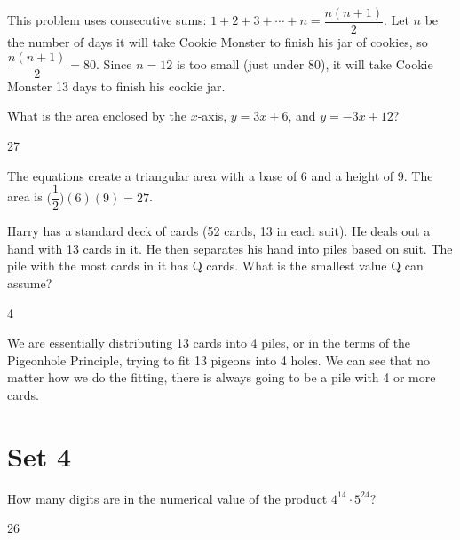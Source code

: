 \documentclass[11pt]{article}
\begin{document}
\begin{solution}
This problem uses consecutive sums: $1+2+3+ \cdots +n = \dfrac{n(n+1)}{2}$. Let $n$ be the number of days it will take Cookie Monster to finish his jar of cookies, so $\dfrac{n(n+1)}{2} = 80$. Since $n = 12$ is too small (just under 80), it will take Cookie Monster 13 days to finish his cookie jar.
\end{solution}


\begin{problem}%
What is the area enclosed by the $x$-axis, $y=3x+6$, and $y=-3x+12$?
\end{problem}

\begin{answer}
27
\end{answer}
 
\begin{solution}
The equations create a triangular area with a base of 6 and a height of 9. The area is $\bigg(\dfrac{1}{2}\bigg)(6)(9) = 27$.
\end{solution}


\begin{problem}
Harry has a standard deck of cards (52 cards, 13 in each suit). He deals out a hand with 13 cards in it. He then separates his hand into piles based on suit. The pile with the most cards in it has Q cards. What is the smallest value Q can assume?
\end{problem}

\begin{answer}
4
\end{answer}

\begin{solution} %
We are essentially distributing 13 cards into 4 piles, or in the terms of the Pigeonhole Principle, trying to fit 13 pigeons into 4 holes. We can see that no matter how we do the fitting, there is always going to be a pile with 4 or more cards. 
\end{solution}

\newpage

\section*{Set 4}

\begin{problem}
How many digits are in the numerical value of the product $4^{14} \cdot 5^{24}$?
\end{problem}

\begin{answer}
26
\end{answer}
\end{document}
